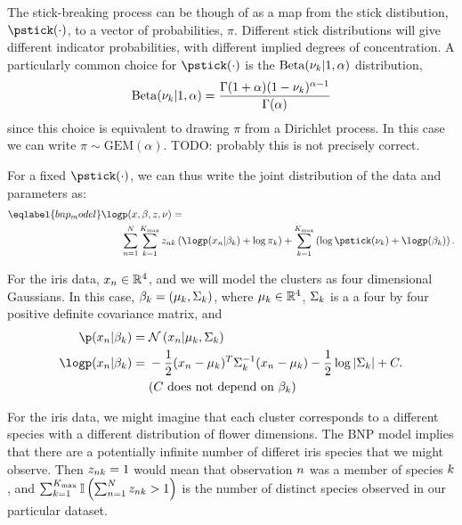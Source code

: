 The stick-breaking process can be though of as a map from  the stick
distibution, $\pstick(\cdot)$, to a vector of probabilities, $\pi$. Different
stick distributions will give different indicator probabilities, with different
implied degrees of concentration.  A particularly common choice for
$\pstick(\cdot)$ is the $\mathrm{Beta}(\nu_{k} \vert 1, \alpha)$ distribution,
%
\begin{align*}
%
\mathrm{Beta}(\nuk \vert 1, \alpha) =
    \frac{\Gamma(1 + \alpha) (1 - \nuk)^{\alpha - 1}}
         {\Gamma(\alpha)}
%
\end{align*}
%
since this choice is equivalent to drawing $\pi$ from a Dirichlet process.
In this case we can write $\pi \sim \mathrm{GEM}(\alpha)$.  TODO: probably
this is not precisely correct.

For a fixed $\pstick(\cdot)$, we can thus write the joint distribution of
the data and parameters as:
%
\begin{align}\eqlabel{bnp_model}
%
\MoveEqLeft
\logp(\x, \beta, \z, \nu) ={}
\nonumber\\&
    \sum_{n=1}^N \sum_{k=1}^{\kmax}
        \z_{\n\k} \left(
            \logp(\x_n \vert \beta_\k) + \log \pi_\k
        \right) +
    \sum_{k=1}^{\kmax} \left(
        \log \pstick(\nuk) + \logp(\beta_\k)
    \right).
%
\end{align}
%

\begin{ex}
%
For the iris data, $x_n \in \mathbb{R}^4$, and we will model the clusters as
four dimensional Gaussians.  In this case, $\beta_k = (\mu_k, \Sigma_k)$,
where $\mu_k \in \mathbb{R}^4$, $\Sigma_k$ is a a four by four positive
definite covariance matrix, and
%
\begin{align*}
%
\p(\x_\n \vert \beta_\k) ={}& \normdist{\x_n \vert \mu_\k, \Sigma_\k} \\
\logp(\x_\n \vert \beta_\k) ={}&
    -\frac{1}{2}(\x_n - \mu_k)^T \Sigma_\k^{-1} (\x_n - \mu_k)
    -\frac{1}{2} \log |\Sigma_\k| + \const.\\
    & \constdesc{\beta_\k}
%
\end{align*}

For the iris data, we might imagine that each cluster corresponds to a different
species with a different distribution of flower dimensions.  The BNP model
implies that there are a potentially infinite number of differet iris species
that we might observe.  Then $z_{nk} = 1$ would mean that observation $n$
was a member of species $k$, and $\sum_{k=1}^{K_{\mathrm{max}}} \mathbb{I}\left( \sum_{n=1}^{N}
z_{nk} > 1\right)$ is the number of distinct species observed in our particular
dataset.
%
\end{ex}

